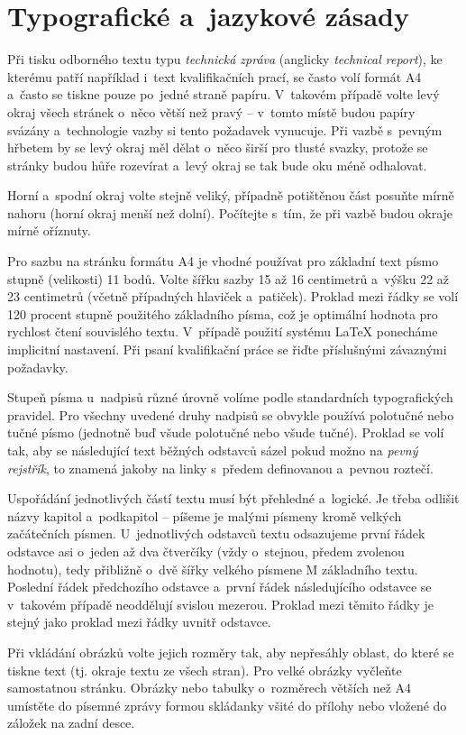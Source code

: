 \chapter{Typografické a~jazykové zásady}
Při tisku odborného textu typu {\it technická zpráva} (anglicky {\it technical report}), ke kterému patří například i~text kvalifikačních prací, se často volí formát A4 a~často se tiskne pouze po~jedné straně papíru. V~takovém případě volte levý okraj všech stránek o~něco větší než pravý -- v~tomto místě budou papíry svázány a~technologie vazby si tento požadavek vynucuje. Při vazbě s~pevným hřbetem by se levý okraj měl dělat o~něco širší pro tlusté svazky, protože se stránky budou hůře rozevírat a~levý okraj se tak bude oku méně odhalovat.

Horní a~spodní okraj volte stejně veliký, případně potištěnou část posuňte mírně nahoru (horní okraj menší než dolní). Počítejte s~tím, že při vazbě budou okraje mírně oříznuty.

Pro sazbu na stránku formátu A4 je vhodné používat pro základní text písmo stupně (velikosti) 11 bodů. Volte šířku sazby 15 až 16 centimetrů a~výšku 22 až 23 centimetrů (včetně případných hlaviček a~patiček). Proklad mezi řádky se volí 120 procent stupně použitého základního písma, což je optimální hodnota pro rychlost čtení souvislého textu. V~případě použití systému LaTeX ponecháme implicitní nastavení. Při psaní kvalifikační práce se řiďte příslušnými závaznými požadavky.

Stupeň písma u~nadpisů různé úrovně volíme podle standardních typografických pravidel. 
Pro všechny uvedené druhy nadpisů se obvykle používá polotučné nebo tučné písmo (jednotně buď všude polotučné nebo všude tučné). Proklad se volí tak, aby se následující text běžných odstavců sázel pokud možno na {\it pevný rejstřík}, to znamená jakoby na linky s~předem definovanou a~pevnou roztečí.

Uspořádání jednotlivých částí textu musí být přehledné a~logické. Je třeba odlišit názvy kapitol a~podkapitol -- píšeme je malými písmeny kromě velkých začátečních písmen. U~jednotlivých odstavců textu odsazujeme první řádek odstavce asi o~jeden až dva čtverčíky (vždy o~stejnou, předem zvolenou hodnotu), tedy přibližně o~dvě šířky velkého písmene M základního textu. Poslední řádek předchozího odstavce a~první řádek následujícího odstavce se v~takovém případě neoddělují svislou mezerou. Proklad mezi těmito řádky je stejný jako proklad mezi řádky uvnitř odstavce.

Při vkládání obrázků volte jejich rozměry tak, aby nepřesáhly oblast, do které se tiskne text (tj. okraje textu ze všech stran). Pro velké obrázky vyčleňte samostatnou stránku. Obrázky nebo tabulky o~rozměrech větších než A4 umístěte do písemné zprávy formou skládanky všité do přílohy nebo vložené do záložek na zadní desce.

